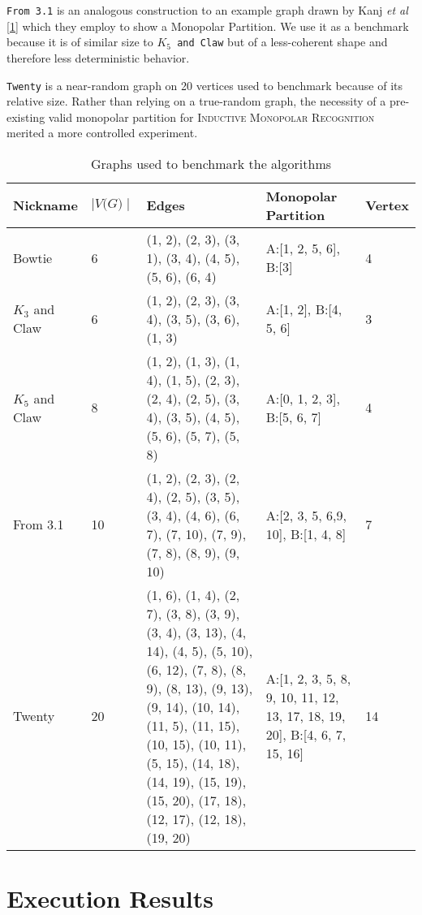 \documentclass[11pt]{article}
\newcommand{\inlinecode}{\texttt}
\begin{document}
\inlinecode{From 3.1} is an analogous construction to an example graph drawn by Kanj \textit{et al} \ref{1} which they employ to show a Monopolar Partition. We use it as a benchmark because it is of similar size to \inlinecode{$K_5$ and Claw} but of a less-coherent shape and therefore less deterministic behavior.

\inlinecode{Twenty} is a near-random graph on 20 vertices used to benchmark because of its relative size. Rather than relying on a true-random graph, the necessity of a pre-existing valid monopolar partition for \textsc{Inductive Monopolar Recognition} merited a more controlled experiment.

\begin{table}[ht]
\begin{center}
\begin{tabu} to 0.9\textwidth { | X[l] X[c] X[c] X[c] X[c] | }
\hline
Nickname & $\mid\textit{V(G)}\mid$ & Edges & Monopolar Partition & Vertex \\
[0.5ex]
\hline
\hline
Bowtie & 6 & (1, 2), (2, 3), (3, 1), (3, 4), (4, 5), (5, 6), (6, 4) & A:[1, 2, 5, 6], B:[3] & 4 \\
[0.3ex]
\hline
$K_3$ and Claw & 6 & (1, 2), (2, 3), (3, 4), (3, 5), (3, 6), (1, 3) & A:[1, 2], B:[4, 5, 6] & 3 \\
[0.3ex]
\hline
$K_5$ and Claw & 8 & (1, 2), (1, 3), (1, 4), (1, 5), (2, 3), (2, 4), (2, 5), (3, 4), (3, 5), (4, 5), (5, 6), (5, 7), (5, 8) & A:[0, 1, 2, 3], B:[5, 6, 7] & 4 \\
[0.3ex]
\hline
From 3.1 & 10 & (1, 2), (2, 3), (2, 4), (2, 5), (3, 5), (3, 4), (4, 6), (6, 7), (7, 10), (7, 9), (7, 8), (8, 9), (9, 10) & A:[2, 3, 5, 6,9, 10], B:[1, 4, 8] & 7 \\
[0.3ex]
\hline
Twenty & 20 & (1, 6), (1, 4), (2, 7), (3, 8), (3, 9), (3, 4), (3, 13), (4, 14), (4, 5), (5, 10), (6, 12), (7, 8), (8, 9), (8, 13), (9, 13), (9, 14), (10, 14), (11, 5), (11, 15), (10, 15), (10, 11), (5, 15), (14, 18), (14, 19), (15, 19), (15, 20), (17, 18), (12, 17), (12, 18), (19, 20) & A:[1, 2, 3, 5, 8, 9, 10, 11, 12, 13, 17, 18, 19, 20], B:[4, 6, 7, 15, 16] & 14 \\
[0.3ex]
\hline
\end{tabu}
\caption{Graphs used to benchmark the algorithms}
\label{table:graphs}
\end{center}
\end{table}

\section{Execution Results}
\label{subsec:structural}
\end{document}
